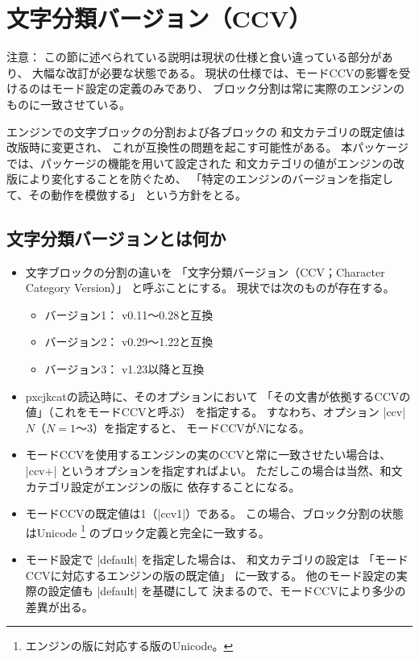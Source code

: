 \documentclass[uplatex,dvipdfmx,a4paper]{jsarticle}
\newcommand{\Pkg}[1]{\textsf{#1}}
\newcommand{\Means}{：\quad}
\newcommand{\strong}{\textsf}
\begin{document}
\section{文字分類バージョン（CCV）}
\label{sec:CCV}

\noindent \strong{注意}\Means
この節に述べられている説明は現状の仕様と食い違っている部分があり、
大幅な改訂が必要な状態である。
現状の仕様では、モードCCVの影響を受けるのはモード設定の定義のみであり、
ブロック分割は常に実際のエンジンのものに一致させている。

\bigskip

{\upTeX}エンジンでの文字ブロックの分割および各ブロックの
和文カテゴリの既定値は改版時に変更され、
これが互換性の問題を起こす可能性がある。
本パッケージでは、パッケージの機能を用いて設定された
和文カテゴリの値がエンジンの改版により変化することを防ぐため、
「特定のエンジンのバージョンを指定して、その動作を模倣する」
という方針をとる。

\subsection{文字分類バージョンとは何か}

\begin{itemize}
\item 文字ブロックの分割の違いを
  「\strong{文字分類バージョン}（CCV；Character Category Version）」
  と呼ぶことにする。
  現状では次のものが存在する。
  \begin{itemize}
  \item バージョン1： {\upTeX} v0.11～0.28と互換
  \item バージョン2： {\upTeX} v0.29～1.22と互換
  \item バージョン3： {\upTeX} v1.23以降と互換
  \end{itemize}

\item \Pkg{pxcjkcat}の読込時に、そのオプションにおいて
  「その文書が依拠するCCVの値」（これを\strong{モードCCV}と呼ぶ）
  を指定する。
  すなわち、オプション |ccv|$N$（$N=\mbox{1～3}$）を指定すると、
  モードCCVが$N$になる。

\item モードCCVを使用するエンジンの実のCCVと常に一致させたい場合は、
  |ccv+| というオプションを指定すればよい。
  ただしこの場合は当然、和文カテゴリ設定がエンジンの版に
  依存することになる。

\item モードCCVの既定値は1（|ccv1|）である。
  この場合、ブロック分割の状態はUnicode%
  \footnote{エンジンの版に対応する版のUnicode。}%
  のブロック定義と完全に一致する。

\item モード設定で |default| を指定した場合は、
  和文カテゴリの設定は
  「モードCCVに対応するエンジンの版の既定値」
  に一致する。
  他のモード設定の実際の設定値も |default| を基礎にして
  決まるので、モードCCVにより多少の差異が出る。

\end{itemize}
\end{document}
